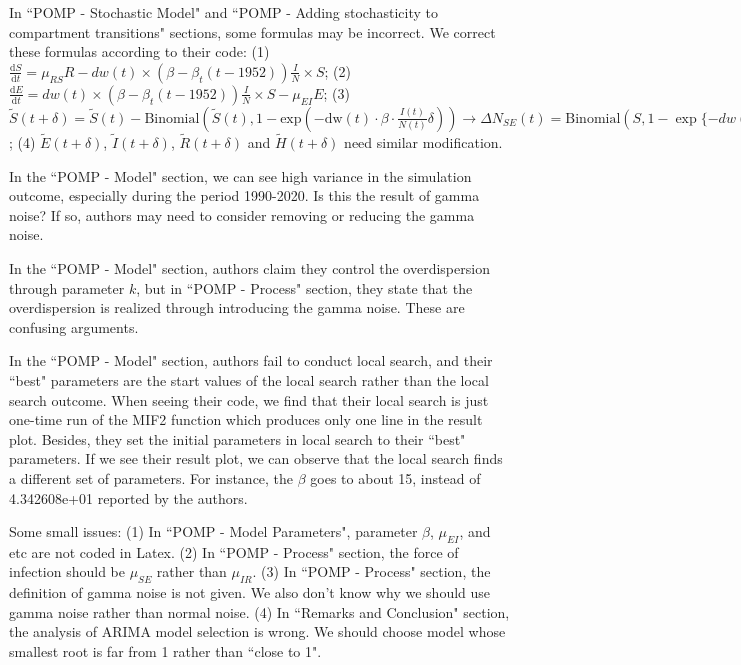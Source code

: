 \documentclass[12pt]{article}
\newcommand{\diffSymbol}{\mathrm{d}}
\begin{document}
In ``POMP - Stochastic Model" and ``POMP - Adding stochasticity to compartment transitions" sections, some formulas may be incorrect. We correct these formulas according to their code: (1) $\frac{\diffSymbol S}{\diffSymbol t} = \mu_{RS} R - dw(t) \times (\beta - \beta_t (t - 1952)) \frac{I}{N} \times S$; (2) $\frac{\diffSymbol E}{\diffSymbol t} = dw(t) \times (\beta - \beta_t (t - 1952)) \frac{I}{N} \times S - \mu_{EI} E$; (3) $\tilde{S}(t + \delta) = \tilde{S}(t) - \text{Binomial}(\tilde{S}(t), 1 - \text{exp}(-\text{dw}(t) \cdot \beta \cdot \frac{I(t)}{N(t)} \delta)) \rightarrow \Delta N_{SE}(t) = \text{Binomial}(S, 1 - \exp\{-dw(t) \times (\beta - \beta_t (t - 1952)) \frac{I}{N} \Delta t\})$; (4) $\tilde{E}(t + \delta)$, $\tilde{I}(t + \delta)$, $\tilde{R}(t + \delta)$ and $\tilde{H}(t + \delta)$ need similar modification.


In the ``POMP - Model" section, we can see high variance in the simulation outcome, especially during the period 1990-2020. Is this the result of gamma noise? If so, authors may need to consider removing or reducing the gamma noise.


In the ``POMP - Model" section, authors claim they control the overdispersion through parameter $k$, but in ``POMP - Process" section, they state that the overdispersion is realized through introducing the gamma noise. These are confusing arguments.


In the ``POMP - Model" section, authors fail to conduct local search, and their ``best" parameters are the start values of the local search rather than the local search outcome. When seeing their code, we find that their local search is just one-time run of the MIF2 function which produces only one line in the result plot. Besides, they set the initial parameters in local search to their ``best" parameters. If we see their result plot, we can observe that the local search finds a different set of parameters. For instance, the $\beta$ goes to about 15, instead of 4.342608e+01 reported by the authors.


Some small issues: (1) In ``POMP - Model Parameters", parameter $\beta$, $\mu_{EI}$, and etc are not coded in Latex. (2) In ``POMP - Process" section, the force of infection should be $\mu_{SE}$ rather than $\mu_{IR}$. (3)  In ``POMP - Process" section, the definition of gamma noise is not given. We also don't know why we should use gamma noise rather than normal noise. (4) In ``Remarks and Conclusion" section, the analysis of ARIMA model selection is wrong. We should choose model whose smallest root is far from 1 rather than ``close to 1".
\end{document}
